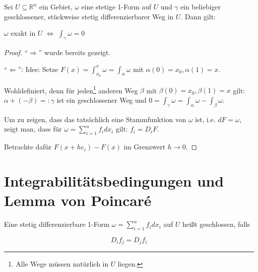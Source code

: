 \begin{theorem}
	Sei $U \subseteq \mathbb R^n$ ein Gebiet, $\omega$ eine stetige 1-Form auf $U$ und $\gamma$ ein beliebiger geschlossener, st\"uckweise stetig differenzierbarer Weg in $U$. Dann gilt:

	$\omega$ exakt in $U$ $\Leftrightarrow$ $\int_\gamma \omega = 0$
\end{theorem}
\begin{proof}
	``$\Rightarrow$'' wurde bereits gezeigt.
	
	``$\Leftarrow$'': Idee: Setze $F(x) = \int_{x_0}^x \omega = \int_\alpha \omega$ mit $\alpha(0)=x_0, \alpha(1)=x$.
	
	Wohldefiniert, denn f\"ur jeden\footnote{Alle Wege m\"ussen nat\"urlich in $U$ liegen.} anderen Weg $\beta$ mit $\beta(0)=x_0, \beta(1)=x$ gilt: $\alpha + (-\beta)=:\gamma$ ist ein geschlossener Weg und $0 = \int_\gamma \omega = \int_\alpha \omega - \int_\beta \omega$.
	
	Um zu zeigen, dass das tats\"achlich eine Stammfunktion von $\omega$ ist, i.e. $dF = \omega$, zeigt man, dass f\"ur $\omega = \sum_{i=1}^n f_i dx_i$ gilt: $f_i = D_i F$.
	
	Betrachte daf\"ur $F(x+he_i)-F(x)$ im Grenzwert $h\rightarrow 0$.
\end{proof}



\section{Integrabilit\"atsbedingungen und Lemma von Poincar\'e}
\begin{definition}[Geschlossenheit]
	Eine stetig differenzierbare 1-Form $\omega = \sum_{i=1}^n f_i dx_i$ auf $U$ hei\ss t geschlossen, falls
	
	\begin{equation}\label{eq:integrationsbedingungenFuerGeschlossenheit}
		D_i f_j = D_j f_i
	\end{equation}

\end{definition}

